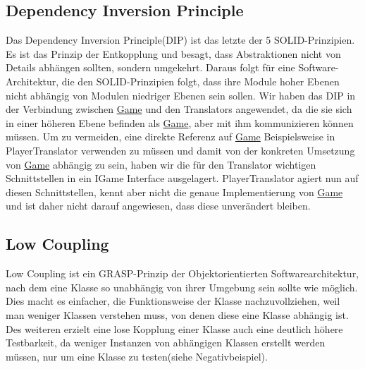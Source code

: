 \documentclass[
10pt, %
a4paper, %
oneside, %
headinclude,footinclude, %
BCOR5mm, %
]{scrartcl}
\begin{document}
\begin{onehalfspace}
\subsection{Dependency Inversion Principle}
\label{sec:depin}
Das Dependency Inversion Principle(DIP) ist das letzte der 5 SOLID-Prinzipien. Es ist das Prinzip der Entkopplung und besagt, dass Abstraktionen nicht von Details abhängen sollten, sondern umgekehrt. Daraus folgt für eine Software-Architektur, die den SOLID-Prinzipien folgt, dass ihre Module hoher Ebenen nicht abhängig von Modulen niedriger Ebenen sein sollen.
Wir haben das DIP in der Verbindung zwischen \href{https://github.com/schmida736/Chess-AdvancedSE/blob/main/Chess-AdvancedSE/Game\%20Elements/Game.cs}{Game} und den Translators angewendet, da die sie sich in einer höheren Ebene befinden als \href{https://github.com/schmida736/Chess-AdvancedSE/blob/main/Chess-AdvancedSE/Game\%20Elements/Game.cs}{Game}, aber mit ihm kommunizieren können müssen.
Um zu vermeiden, eine direkte Referenz auf \href{https://github.com/schmida736/Chess-AdvancedSE/blob/main/Chess-AdvancedSE/Game\%20Elements/Game.cs}{Game} Beispielsweise in PlayerTranslator verwenden zu müssen und damit von der konkreten Umsetzung von \href{https://github.com/schmida736/Chess-AdvancedSE/blob/main/Chess-AdvancedSE/Game\%20Elements/Game.cs}{Game} abhängig zu sein, haben wir die für den Translator wichtigen Schnittstellen in ein IGame Interface ausgelagert. PlayerTranslator agiert nun auf diesen Schnittstellen, kennt aber nicht die genaue Implementierung von \href{https://github.com/schmida736/Chess-AdvancedSE/blob/main/Chess-AdvancedSE/Game\%20Elements/Game.cs}{Game} und ist daher nicht darauf angewiesen, dass diese unverändert bleiben.
\subsection{Low Coupling}
Low Coupling ist ein GRASP-Prinzip der Objektorientierten Softwarearchitektur, nach dem eine Klasse so unabhängig von ihrer Umgebung sein sollte wie möglich. Dies macht es einfacher, die Funktionsweise der Klasse nachzuvollziehen, weil man weniger Klassen verstehen muss, von denen diese eine Klasse abhängig ist. Des weiteren erzielt eine lose Kopplung einer Klasse auch eine deutlich höhere Testbarkeit, da weniger Instanzen von abhängigen Klassen erstellt werden müssen, nur um eine Klasse zu testen(siehe Negativbeispiel).


\end{onehalfspace}
\end{document}
